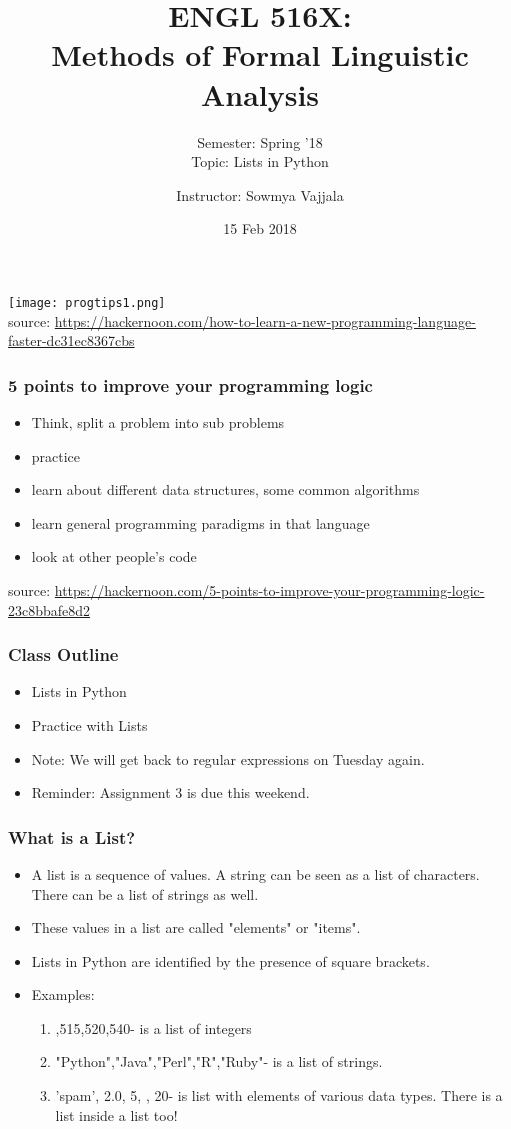 \documentclass{beamer}
\author[Sowmya Vajjala]{Instructor: Sowmya Vajjala}
\title[ENGL 516X]{ENGL 516X: \\ Methods of Formal Linguistic Analysis}
\subtitle{Semester: Spring '18 \\ Topic: Lists in Python}
\date{15 Feb 2018}
\institute{Iowa State University, USA}
\begin{document}
\begin{frame}\titlepage
\end{frame}

%
\begin{frame}
\texttt{[image: progtips1.png]}
\\ source: \url{https://hackernoon.com/how-to-learn-a-new-programming-language-faster-dc31ec8367cbs}
\end{frame}

\begin{frame}
\frametitle{5 points to improve your programming logic}
\begin{itemize}
\item Think, split a problem into sub problems
\item practice
\item learn about different data structures, some common algorithms
\item learn general programming paradigms in that language
\item look at other people's code
\end{itemize}
source: \url{https://hackernoon.com/5-points-to-improve-your-programming-logic-23c8bbafe8d2}
\end{frame}

\begin{frame}
\frametitle{Class Outline}
\begin{itemize}
\item Lists in Python
\item Practice with Lists
\item Note: We will get back to regular expressions on Tuesday again.
\item Reminder: Assignment 3 is due this weekend.
\end{itemize}
\end{frame}

\begin{frame}
\frametitle{What is a List?}
\begin{itemize}
\item A list is a sequence of values. A string can be seen as a list of characters. There can be a list of strings as well.
\item These values in a list are called "elements" or "items".
\item Lists in Python are identified by the presence of square brackets. 
\item Examples:
\begin{enumerate}
\item {},515,520,540\rbrack - is a list of integers
\item \lbrack"Python","Java","Perl","R","Ruby"\rbrack - is a list of strings.
\item \lbrack'spam', 2.0, 5, , 20\rbrack\rbrack - is list with elements of various data types. There is a list inside a list too!
\end{enumerate}
\end{itemize}
\end{frame}
\end{document}

